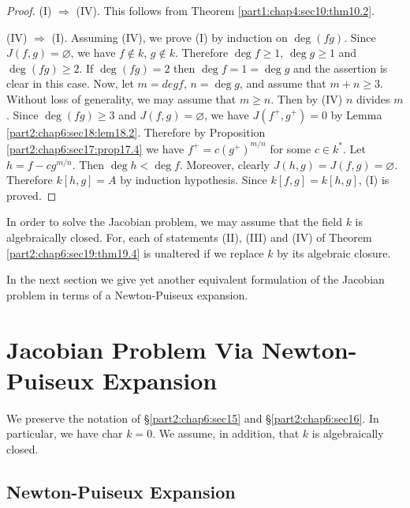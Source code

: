 \begin{proof}
(I) $\Rightarrow$ (IV). This follows from
  Theorem \ref{part1:chap4:sec10:thm10.2}.

(IV) $\Rightarrow$ (I). Assuming (IV), we prove (I) by induction on
  $\deg (fg)$. Since $J(f, g)= \diameter$, we have $f \notin k$, $g
  \notin k$. Therefore $\deg f \geq 1$, $\deg g\geq 1$ and $\deg(fg)
  \geq 2$. If $\deg (fg) =2$ then $\deg f=1= \deg g$ and the assertion
  is clear in this case. Now, let $m= deg f$, $n = \deg g$, and assume
  that $m+n \geq 3$. Without loss of generality, we may assume that $m
  \geq n$. Then by (IV) $n$ divides $m$. Since $\deg (fg) \geq 3$ and
  $J(f, g)= \diameter$, we have $J(f^+ , g^+)=0$ by Lemma
  \ref{part2:chap6:sec18:lem18.2}. Therefore by Proposition
  \ref{part2:chap6:sec17:prop17.4} we have $f^+= c(g^+)^{m/n}$ for
  some $c \in k^*$. Let $h= f- cg^{m/n}$. Then $\deg h < \deg
  f$. Moreover, clearly $J(h, g)= J(f, g)= \diameter$. Therefore
  $k[h,g]=A$ by induction hypothesis. Since $k[f, g]= k[h, g]$, (I)
  is proved.
\end{proof}

\begin{remark}\label{part2:chap6:sec19:rem19.5}
  In order to solve the Jacobian problem, we may assume that the field
  $k$ is algebraically closed. For, each of statements (II), (III) and
  (IV) of Theorem \ref{part2:chap6:sec19:thm19.4} is unaltered if we
  replace $k$ by its algebraic closure.
\end{remark}

\begin{remark}\label{part2:chap6:sec19:rem19.6}
  In the next section we give yet another equivalent formulation of
  the Jacobian problem in terms of a Newton-Puiseux expansion.
\end{remark}

\section{Jacobian Problem Via Newton-Puiseux
  Expansion}\label{part2:chap6:sec20} 

We preserve the notation of \S \ref{part2:chap6:sec15} and
\S \ref{part2:chap6:sec16}. In particular, we have char $k=0$. We
assume, in addition, that $k$ is algebraically closed.

\subsection{Newton-Puiseux Expansion}\label{part2:chap6:sec20:ss20.1} 

